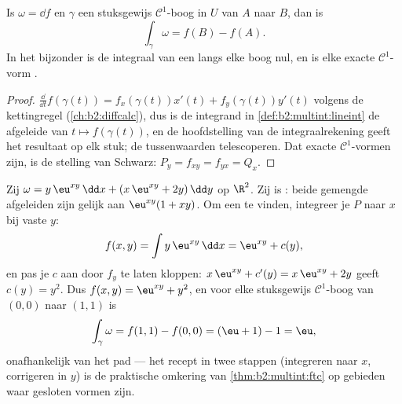 \begin{theorem}\label{thm:b2:multint:ftc}
Is $\omega = \dd f$  en $\gamma$ een stuksgewijs
$\mathcal{C}^1$-boog in $U$ van $A$ naar $B$, dan is
\[
\int_\gamma \omega = f(B) - f(A) .
\]
In het bijzonder is de integraal van een  langs elke
 boog nul, en is elke exacte $\mathcal{C}^1$-vorm .
\end{theorem}

\begin{proof}
$\frac{\dd}{\dd t}f(\gamma(t)) = f_x(\gamma(t))x'(t) +
f_y(\gamma(t))y'(t)$ volgens de kettingregel
(\cref{ch:b2:diffcalc}), dus is de integrand in
\cref{def:b2:multint:lineint} de afgeleide van $t \mapsto
f(\gamma(t))$, en de hoofdstelling van de integraalrekening geeft
het resultaat op elk stuk; de tussenwaarden telescoperen. Dat
exacte $\mathcal{C}^1$-vormen  zijn, is de stelling van
Schwarz: $P_y = f_{xy} = f_{yx} = Q_x$.
\end{proof}

\begin{example}\label{ex:b2:multint:potential}
Zij $\omega = y\,\eu^{xy}\,\dd x + (x\,\eu^{xy} + 2y)\,\dd y$ op
$\R^2$. Zij is : beide gemengde afgeleiden zijn gelijk aan
$\eu^{xy}(1 + xy)$. Om een  te vinden, integreer je $P$
naar $x$ bij vaste $y$:
\[
f(x, y) = \int y\,\eu^{xy}\,\dd x = \eu^{xy} + c(y),
\]
en pas je $c$ aan door $f_y$ te laten kloppen: $x\,\eu^{xy} + c'(y)
= x\,\eu^{xy} + 2y$ geeft $c(y) = y^2$. Dus $f(x,y) = \eu^{xy} +
y^2$, en voor elke stuksgewijs $\mathcal C^1$-boog van $(0,0)$ naar
$(1,1)$ is
\[
\int_\gamma\omega = f(1,1) - f(0,0) = (\eu + 1) - 1 = \eu ,
\]
onafhankelijk van het pad --- het recept in twee stappen
(integreren naar $x$, corrigeren in $y$) is de praktische omkering
van \cref{thm:b2:multint:ftc} op gebieden waar gesloten vormen
 zijn.
\end{example}


